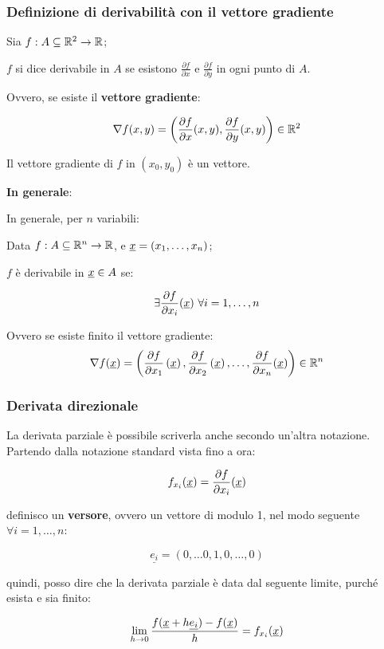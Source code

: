\filbreak{}
\subsubsection{Definizione di derivabilità con il vettore gradiente}

Sia \(f: A \subseteq \mathbb{R}^2 \to \mathbb{R} \);

\(f\) si dice derivabile in \(A\) se esistono \(\frac{\partial f}{\partial x}\) e \(\frac{\partial f}{\partial y}\) in ogni punto di \(A\).

Ovvero, se esiste il \textbf{vettore gradiente}:

\[
    \nabla f(x,y)=\left( \frac{\partial f}{\partial x}(x,y), \frac{\partial f}{\partial y}(x,y) \right) \in \mathbb{R}^2
\]

Il vettore gradiente di \(f\) in \((x_0, y_0)\) è un vettore.

\textbf{In generale}:

In generale, per \(n\) variabili:

Data \(f: A \subseteq \mathbb{R}^n \to \mathbb{R} \), e \(\underline{x} = (x_1, \ldots, x_n)\);

\(f\) è derivabile in \(\underline{x} \in A\) se:

\[\exists \frac{\partial f}{\partial x_i}(\underline{x}) ~\forall i = 1,\ldots,n\]

Ovvero se esiste finito il vettore gradiente:
\[
    \nabla f(\underline{x} ) = \left( \frac{\partial f}{\partial x_1}\left(\underline{x}\right), \frac{\partial f}{\partial x_2}\left(\underline{x}\right), \ldots , \frac{\partial f}{\partial x_n}(\underline{x} ) \right) \in \mathbb{R}^{n}
\]

\filbreak{}
\subsubsection{Derivata direzionale}

La derivata parziale è possibile scriverla anche secondo un'altra notazione. Partendo dalla notazione standard vista fino a ora:

\[
    f_{x_i} (\underline{x} ) = \frac{\partial f}{\partial x_i}(\underline{x} )
\]

definisco un \textbf{versore}, ovvero un vettore di modulo 1, nel modo seguente \(\forall i = 1, \ldots ,n\):

\[
    \underline{e_i} = (0, \ldots 0,1,0,\ldots,0)
\]

quindi, posso dire che la derivata parziale è data dal seguente limite, purché esista e sia finito:

\[
    \lim_{ h \to 0 } \frac{f(\underline{x} + h \underline{e_i}) - f(\underline{x} )}{h} = f_{x_i}(\underline{x} )
\]

